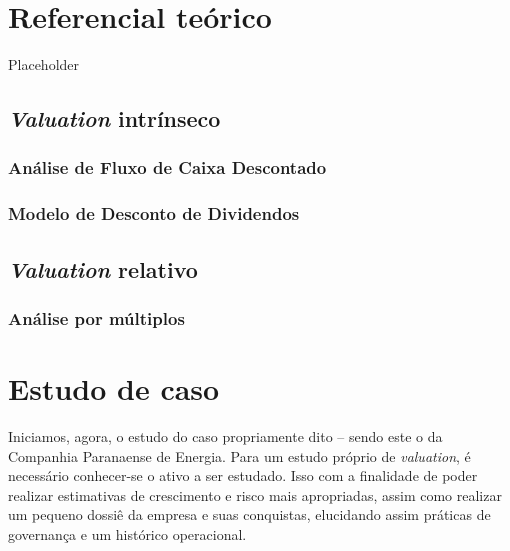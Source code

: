 \documentclass[grad,numbers]{coppe}
\begin{document}
  \hypertarget{referencial-teuxf3rico}{%
  \chapter{Referencial teórico}\label{referencial-teuxf3rico}}

  Placeholder

  \hypertarget{valuation-intruxednseco}{%
  \section{\texorpdfstring{\emph{Valuation} intrínseco}{Valuation intrínseco}}\label{valuation-intruxednseco}}

  \hypertarget{anuxe1lise-de-fluxo-de-caixa-descontado}{%
  \subsection{Análise de Fluxo de Caixa Descontado}\label{anuxe1lise-de-fluxo-de-caixa-descontado}}

  \hypertarget{modelo-de-desconto-de-dividendos}{%
  \subsection{Modelo de Desconto de Dividendos}\label{modelo-de-desconto-de-dividendos}}

  \hypertarget{valuation-relativo}{%
  \section{\texorpdfstring{\emph{Valuation} relativo}{Valuation relativo}}\label{valuation-relativo}}

  \hypertarget{anuxe1lise-por-muxfaltiplos}{%
  \subsection{Análise por múltiplos}\label{anuxe1lise-por-muxfaltiplos}}

  \hypertarget{estudo-de-caso}{%
  \chapter{Estudo de caso}\label{estudo-de-caso}}

  Iniciamos, agora, o estudo do caso propriamente dito -- sendo este o da Companhia Paranaense de Energia. Para um estudo próprio de \emph{valuation}, é necessário conhecer-se o ativo a ser estudado. Isso com a finalidade de poder realizar estimativas de crescimento e risco mais apropriadas, assim como realizar um pequeno dossiê da empresa e suas conquistas, elucidando assim práticas de governança e um histórico operacional.
\end{document}
